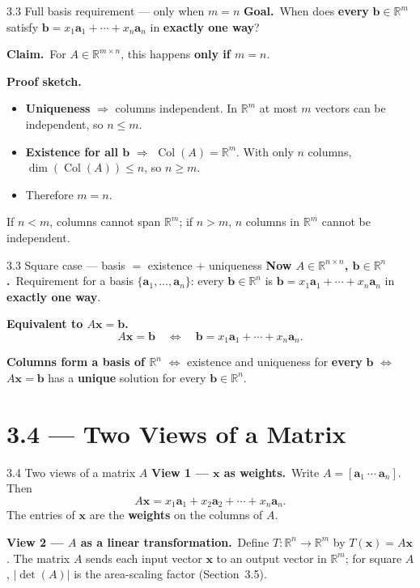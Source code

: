 \documentclass[11pt,aspectratio=169]{beamer}
\begin{document}
\begin{frame}{3.3 Full basis requirement --- only when $m=n$}
  \footnotesize
  \textbf{Goal.}\
  When does \textbf{every} $\mathbf{b}\in\mathbb{R}^m$ satisfy
  $\mathbf{b}=x_1\mathbf{a}_1+\cdots+x_n\mathbf{a}_n$ in \textbf{exactly one way}?

  \medskip
  \textbf{Claim.}\
  For $A\in\mathbb{R}^{m\times n}$, this happens \textbf{only if $m=n$}.

  \medskip
  \textbf{Proof sketch.}\
  \begin{itemize}
    \item \textbf{Uniqueness} $\Rightarrow$ columns independent.
      In $\mathbb{R}^m$ at most $m$ vectors can be independent, so $n\le m$.
    \item \textbf{Existence for all $\mathbf{b}$} $\Rightarrow$ $\operatorname{Col}(A)=\mathbb{R}^m$.
      With only $n$ columns, $\dim(\operatorname{Col}(A))\le n$, so $n\ge m$.
    \item Therefore $m=n$.
  \end{itemize}
  If $n<m$, columns cannot span $\mathbb{R}^m$; if $n>m$, $n$ columns in $\mathbb{R}^m$ cannot be
  independent.
\end{frame}

\begin{frame}{3.3 Square case --- basis $=$ existence $+$ uniqueness}
  \footnotesize
  \textbf{Now $A\in\mathbb{R}^{n\times n}$, $\mathbf{b}\in\mathbb{R}^n$.}\
  Requirement for a basis $\{\mathbf{a}_1,\ldots,\mathbf{a}_n\}$:
  every $\mathbf{b}\in\mathbb{R}^n$ is
  $\mathbf{b}=x_1\mathbf{a}_1+\cdots+x_n\mathbf{a}_n$ in \textbf{exactly one way}.

  \medskip
  \textbf{Equivalent to $A\mathbf{x}=\mathbf{b}$.}\
  \[
    A\mathbf{x}=\mathbf{b}
    \quad\Longleftrightarrow\quad
    \mathbf{b}=x_1\mathbf{a}_1+\cdots+x_n\mathbf{a}_n.
  \]

  \medskip
  \textbf{Columns form a basis of $\mathbb{R}^n$} $\Longleftrightarrow$
  existence and uniqueness for \textbf{every} $\mathbf{b}$ $\Longleftrightarrow$
  $A\mathbf{x}=\mathbf{b}$ has a \textbf{unique} solution for every $\mathbf{b}\in\mathbb{R}^n$.
\end{frame}

\section{3.4 --- Two Views of a Matrix}

\begin{frame}{3.4 Two views of a matrix $A$}
  \footnotesize
  \textbf{View 1 --- $\mathbf{x}$ as weights.}\
  Write $A=[\mathbf{a}_1\ \cdots\ \mathbf{a}_n]$. Then
  \[
    A\mathbf{x}=x_1\mathbf{a}_1+x_2\mathbf{a}_2+\cdots+x_n\mathbf{a}_n.
  \]
  The entries of $\mathbf{x}$ are the \textbf{weights} on the columns of $A$.

  \medskip
  \textbf{View 2 --- $A$ as a linear transformation.}\
  Define $T:\mathbb{R}^n\to\mathbb{R}^m$ by $T(\mathbf{x})=A\mathbf{x}$.
  The matrix $A$ sends each input vector $\mathbf{x}$ to an output vector in $\mathbb{R}^m$;
  for square $A$, $|\det(A)|$ is the area-scaling factor (Section~3.5).
\end{frame}
\end{document}

